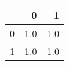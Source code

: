 \begin{tabular}{lrr}
\toprule
{} &    0 &    1 \\
\midrule
0 &  1.0 &  1.0 \\
1 &  1.0 &  1.0 \\
\bottomrule
\end{tabular}
